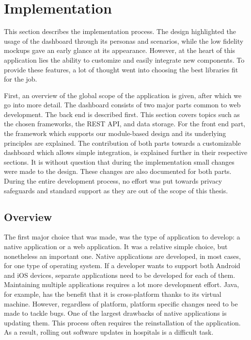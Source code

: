 \section{Implementation}\label{implementation}

This section describes the implementation process. The design highlighted the usage of the dashboard through its personas and scenarios, while the low fidelity mockups gave an early glance at its appearance. However, at the heart of this application lies the ability to customize and easily integrate new components. To provide these features, a lot of thought went into choosing the best libraries fit for the job.

First, an overview of the global scope of the application is given, after which we go into more detail. The dashboard consists of two major parts common to web development. The back end is described first. This section covers topics such as the chosen frameworks, the REST API, and data storage. For the front end part, the framework which supports our module-based design and its underlying principles are explained. The contribution of both parts towards a customizable dashboard which allows simple integration, is explained further in their respective sections. It is without question that during the implementation small changes were made to the design. These changes are also documented for both parts. During the entire development process, no effort was put towards privacy safeguards and standard support as they are out of the scope of this thesis.

    \subsection{Overview}

    The first major choice that was made, was the type of application to develop: a native application or a web application. It was a relative simple choice, but nonetheless an important one. Native applications are developed, in most cases, for one type of operating system. If a developer wants to support both Android and iOS devices, separate applications need to be developed for each of them. Maintaining multiple applications requires a lot more development effort. Java, for example, has the benefit that it is cross-platform thanks to its virtual machine. However, regardless of platform, platform specific changes need to be made to tackle bugs. One of the largest drawbacks of native applications is updating them. This process often requires the reinstallation of the application. As a result, rolling out software updates in hospitals is a difficult task.

